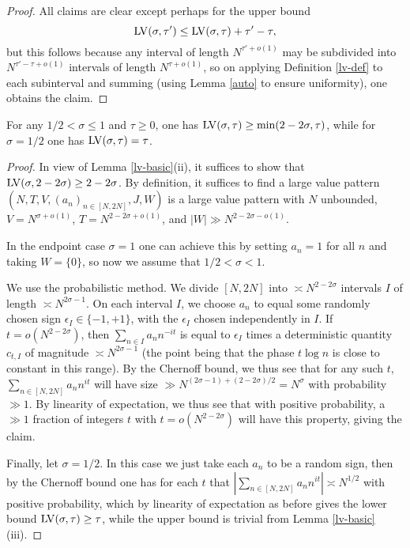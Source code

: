 \begin{proof}
All claims are clear except perhaps for the upper bound
$$ \mathrm{LV}(\sigma,\tau') \leq \mathrm{LV}(\sigma,\tau) + \tau'-\tau,$$
but this follows because any interval of length $N^{\tau'+o(1)}$ may be subdivided into $N^{\tau'-\tau+o(1)}$ intervals of length $N^{\tau+o(1)}$, so on applying Definition \ref{lv-def} to each subinterval and summing (using Lemma \ref{auto} to ensure uniformity), one obtains the claim.
\end{proof}

\begin{lemma}\label{lv-lower}  For any $1/2 < \sigma \leq 1$ and $\tau \geq 0$, one has $\mathrm{LV}(\sigma, \tau) \geq \min(2 - 2 \sigma,\tau)$, while for $\sigma=1/2$ one has $\mathrm{LV}(\sigma,\tau) = \tau$.
\end{lemma}

\begin{proof} In view of Lemma \ref{lv-basic}(ii), it suffices to show that $\mathrm{LV}(\sigma, 2-2\sigma) \geq 2-2\sigma$.  By definition, it suffices to find a large value pattern $(N,T,V,(a_n)_{n \in [N,2N]},J,W)$ is a large value pattern with $N$ unbounded, $V=N^{\sigma+o(1)}$, $T = N^{2-2\sigma+o(1)}$, and $|W| \gg N^{2-2\sigma-o(1)}$.

In the endpoint case $\sigma = 1$ one can achieve this by setting $a_n=1$ for all $n$ and taking $W=\{0\}$, so now we assume that $1/2 < \sigma<1$.

We use the probabilistic method.  We divide $[N,2N]$ into $\asymp N^{2-2\sigma}$ intervals $I$ of length $\asymp N^{2\sigma-1}$.  On each interval $I$, we choose $a_n$ to equal some randomly chosen sign $\epsilon_I \in \{-1,+1\}$, with the $\epsilon_I$ chosen independently in $I$.  If $t = o(N^{2-2\sigma})$, then $\sum_{n \in I} a_n n^{-it}$ is equal to $\epsilon_I$ times a deterministic quantity $c_{t,I}$ of magnitude $\asymp N^{2\sigma-1}$ (the point being that the phase $t \log n$ is close to constant in this range).  By the Chernoff bound, we thus see that for any such $t$, $\sum_{n \in [N,2N]} a_n n^{it}$ will have size $\gg N^{(2\sigma-1) + (2-2\sigma)/2} = N^\sigma$ with probability $\gg 1$. By linearity of expectation, we thus see that with positive probability, a $\gg 1$ fraction of integers $t$ with $t = o(N^{2-2\sigma})$ will have this property, giving the claim.

Finally, let $\sigma=1/2$.  In this case we just take each $a_n$ to be a random sign, then by the Chernoff bound one has for each $t$ that $|\sum_{n \in [N,2N]} a_n n^{it}| \asymp N^{1/2}$ with positive probability, which by linearity of expectation as before gives the lower bound $\mathrm{LV}(\sigma,\tau) \geq \tau$, while the upper bound is trivial from Lemma \ref{lv-basic}(iii).
\end{proof}


